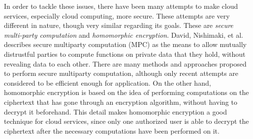 In order to tackle these issues, there have been many attempts to make cloud services, especially cloud computing, more secure. These attempts are very different in nature, though very similar regarding its goals. These are \textit{secure multi-party computation} and \textit{homomorphic encryption}. David, Nishimaki, et al. \cite{cryptoeprint:2015:135} describes secure multiparty computation (MPC) as the means to allow mutually distrustful parties to compute functions on private data that they hold, without revealing data to each other. There are many methods and approaches proposed to perform secure multiparty computation, although only recent attempts are considered to be efficient enough for application. On the other hand, homomorphic encryption is based on the idea of performing computations on the ciphertext that has gone through an encryption algorithm, without having to decrypt it beforehand. This detail makes homomorphic encryption a good technique for cloud services, since only one authorized user is able to decrypt the ciphertext after the necessary computations have been performed on it.

\clearpage

